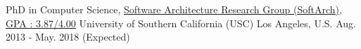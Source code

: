 

\begin{cventries}

  \cventry
    {PhD in Computer Science, \href{http://softarch.usc.edu/} {Software Architecture Research Group (SoftArch), GPA : 3.87/4.00}} %
    {University of Southern California (USC)} %
    {Los Angeles, U.S.} %
	{Aug. 2013 - May. 2018 (Expected)} %
    {
    }
  \vspace{-5mm}
    

\end{cventries}
